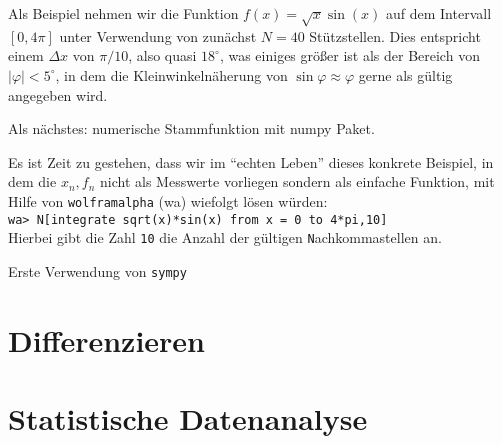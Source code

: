Als Beispiel nehmen wir die Funktion $f(x) = \sqrt{x}\sin(x)$ auf dem Intervall $[0,4\pi]$ unter Verwendung von zunächst $N = 40$ Stützstellen. Dies entspricht einem $\Delta x$ von $\pi/10$, also quasi $18^\circ$, was einiges größer ist als der Bereich  von $\vert \varphi \vert < 5^\circ$, in dem die Kleinwinkelnäherung von $\sin\varphi \approx \varphi$ gerne als gültig angegeben wird. 
%



% 
% 
% 
% 
% 

Als nächstes: numerische Stammfunktion mit numpy Paket.

Es ist Zeit zu gestehen, dass wir im ``echten Leben'' dieses konkrete  Beispiel, in dem die $x_n,f_n$ nicht als Messwerte vorliegen sondern als einfache Funktion, mit Hilfe von \texttt{wolframalpha} (wa) wiefolgt lösen würden:\vspace*{2mm}\\
\texttt{wa> N[integrate sqrt(x)*sin(x) from x = 0 to 4*pi,10]} \vspace*{2mm}\\
Hierbei gibt die Zahl \texttt{10} die Anzahl der gültigen \texttt{N}achkommastellen an. 

Erste Verwendung von \texttt{sympy}


\section{Differenzieren}

\section{Statistische Datenanalyse}
